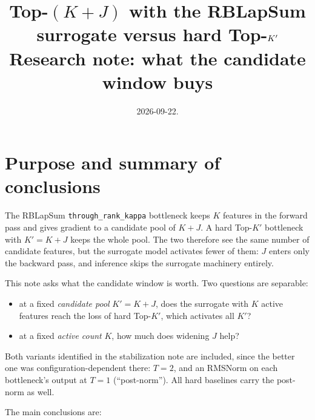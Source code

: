 \documentclass[11pt,a4paper]{article}
\title{Top-$(K{+}J)$ with the RBLapSum surrogate versus hard Top-$\Kp$\\[2pt]
\large Research note: what the candidate window buys}
\author{}
\date{2026-09-22.}
\newcommand{\code}[1]{\texttt{#1}}
\newcommand{\Kp}{K'}
\begin{document}
\maketitle
\vspace{-2em}

\section{Purpose and summary of conclusions}

The RBLapSum \code{through\_rank\_kappa} bottleneck keeps $K$ features in the
forward pass and gives gradient to a candidate pool of $K+J$. A hard Top-$\Kp$
bottleneck with $\Kp = K+J$ keeps the whole pool. The two therefore see the
same number of candidate features, but the surrogate model activates fewer of
them: $J$ enters only the backward pass, and inference skips the surrogate
machinery entirely.

This note asks what the candidate window is worth. Two questions are
separable:

\begin{itemize}[leftmargin=1.4em]
\item at a fixed \emph{candidate pool} $\Kp = K+J$, does the surrogate with $K$
active features reach the loss of hard Top-$\Kp$, which activates all $\Kp$?
\item at a fixed \emph{active count} $K$, how much does widening $J$ help?
\end{itemize}

Both variants identified in the stabilization note are included, since the
better one was configuration-dependent there: $T=2$, and an RMSNorm on each
bottleneck's output at $T=1$ (``post-norm''). All hard baselines carry the
post-norm as well.

The main conclusions are:
\end{document}
